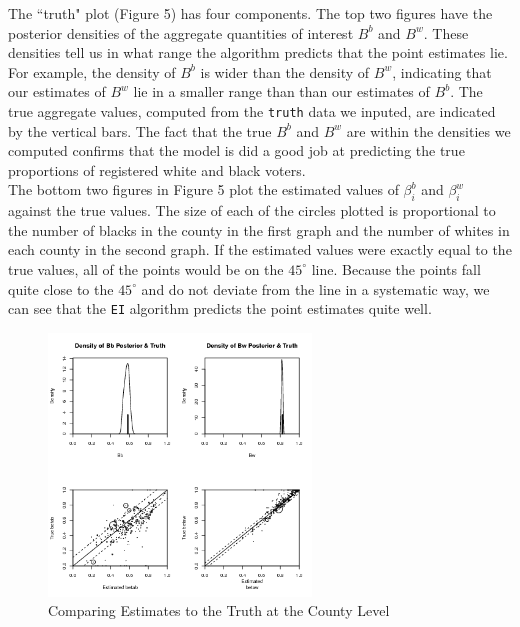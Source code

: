 \documentclass[11pt,oneside,letterpaper,titlepage]{article}
\begin{document}
\noindent The ``truth" plot (Figure 5) has four components.  The top two figures have the posterior densities of the aggregate quantities of interest $B^b$ and $B^w$.  These densities tell us in what range the algorithm predicts that the point estimates lie.  For example, the density of $B^b$ is wider than the density of $B^w$, indicating that our estimates of $B^w$ lie in a smaller range than than our estimates of $B^b$.  The true aggregate values, computed from the \verb#truth# data we inputed, are indicated by the vertical bars.  The fact that the true $B^b$ and $B^w$ are within the densities we computed confirms that the model is did a good job at predicting the true proportions of registered white and black voters.\\
\newline
\noindent The bottom two figures in Figure 5 plot the estimated values of $\beta_i^b$ and $\beta_i^w$ against the true values.  The size of each of the circles plotted is proportional to the number of blacks in the county in the first graph and the number of whites in each county in the second graph. If the estimated values were exactly equal to the true values, all of the points would be on the $45^{\circ}$ line.  Because the points fall quite close to the $45^{\circ}$ and do not deviate from the line in a systematic way, we can see that the \verb#EI# algorithm predicts the point estimates quite well.

\begin{figure}[Ht]
\begin{center}
\includegraphics[width=2.75in, height=2.75in, viewport=0 0 420 395,clip]{truth2.png} 
\end{center}
\caption{Comparing Estimates to the Truth at the County Level}
\label{fig:truth}
\end{figure}

\clearpage
\end{document}
